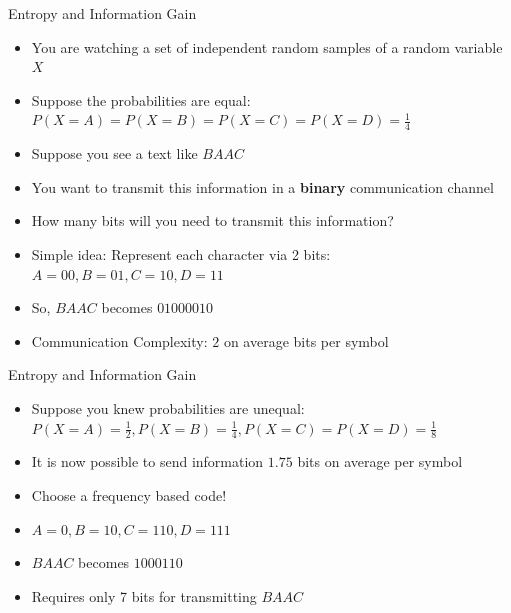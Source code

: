 \documentclass{beamer}
\begin{document}
\begin{frame}{Entropy and Information Gain}
    \begin{itemize}
        \item You are watching a set of independent random samples of a random variable $X$
        \item Suppose the probabilities are equal: $P(X=A) = P(X=B) = P(X=C) = P(X=D) = \frac{1}{4}$
        \item Suppose you see a text like $BAAC$
        \item You want to transmit this information in a {\bf binary} communication channel
        \item How many bits will you need to transmit this information? \pause
        \item Simple idea: Represent each character via 2 bits: $A=00, B=01, C=10, D=11$
        \item So, $BAAC$ becomes $01000010$
        \item Communication Complexity: $2$ on average bits per symbol
    \end{itemize}
\end{frame}

\begin{frame}{Entropy and Information Gain}
    \begin{itemize}
        \item Suppose you knew probabilities are unequal: $P(X=A) = \frac{1}{2}, P(X=B) = \frac{1}{4}, P(X=C) = P(X=D) = \frac{1}{8}$
        \item It is now possible to send information $1.75$ bits on average per symbol \pause
        \item Choose a frequency based code!
        \item $A=0, B=10, C=110, D=111$ \pause
        \item $BAAC$ becomes $1000110$
        \item Requires only 7 bits for transmitting $BAAC$
    \end{itemize}
\end{frame}
\end{document}
